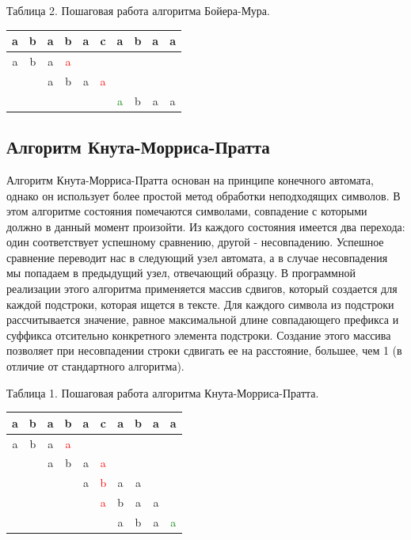 \documentclass[12pt]{report}
\begin{document}
\begin{center}
Таблица 2. Пошаговая работа алгоритма Бойера-Мура.\\
\begin{tabular}{| c | c | c | c | c | c | c | c | c | c | }
	\hline
	a&b&a&b&a&c&a&b&a&a \\
	\hline
	\hline
	a&b&a&\textcolor{red}{a}&&&&&&\\
	\hline
	&&a&b&a&\textcolor{red}{a}&&&&\\
	\hline
	&&&&&&\textcolor{green}{a}&b&a&a\\
	\hline
\end{tabular}
\end{center}


\subsection{Алгоритм Кнута-Морриса-Пратта}
Алгоритм Кнута-Морриса-Пратта основан на принципе конечного автомата, однако он использует более простой метод обработки неподходящих символов. В этом алгоритме состояния помечаются символами, совпадение с которыми должно в данный момент произойти. Из каждого состояния имеется два перехода: один соответствует успешному сравнению, другой - несовпадению. Успешное сравнение переводит нас в следующий узел автомата, а в случае несовпадения мы попадаем в предыдущий узел, отвечающий образцу. 
В программной реализации этого алгоритма применяется массив сдвигов, который создается для каждой подстроки, которая ищется в тексте. Для каждого символа из подстроки рассчитывается значение, равное максимальной длине совпадающего префикса и суффикса отсительно конкретного элемента подстроки. Создание этого массива позволяет при несовпадении строки сдвигать ее на расстояние, большее, чем 1 (в отличие от стандартного алгоритма).

\begin{center}
	Таблица 1. Пошаговая работа алгоритма Кнута-Морриса-Пратта.\\
	
	\begin{tabular}{| c | c | c | c | c | c | c | c | c | c | }
		\hline
		a&b&a&b&a&c&a&b&a&a \\
		\hline
		\hline
		a&b&a&\textcolor{red}{a}&&&&&&\\
		\hline
		&&a&b&a&\textcolor{red}{a}&&&&\\
		\hline
		&&&&a&\textcolor{red}{b}&a&a&&\\
		\hline
		&&&&&\textcolor{red}{a}&b&a&a&\\
		\hline
		&&&&&&a&b&a&\textcolor{green}{a}\\
		\hline
	\end{tabular}
\end{center}
\end{document}
